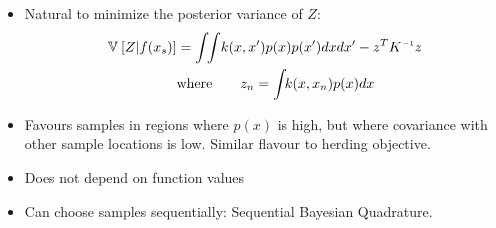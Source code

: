 \documentclass[usenames,dvipsnames]{beamer}
\begin{document}
\begin{frame}[plain, t]
	\titlebodyskip
\pause
\begin{itemize}
\item Natural to minimize the posterior variance of $Z$:
\begin{align*}
\varianceargs{}{Z|f(x_s)} & = \int \! \! \int \! k(\vx, \vx') p(x) p(x') dx dx' - \vz^T K\inv \vz \\
& \textrm{where} \qquad z_n = \int\!\! k(\vx, \vx_n) p(\vx) d\vx
\end{align*}
\pause
\item Favours samples in regions where $p(x)$ is high, but where covariance with other sample locations is low.  Similar flavour to herding objective.
\pause
\item Does not depend on function values
\pause
\item Can choose samples sequentially: Sequential Bayesian Quadrature.
\end{itemize}

	
\end{frame}


\end{document}
